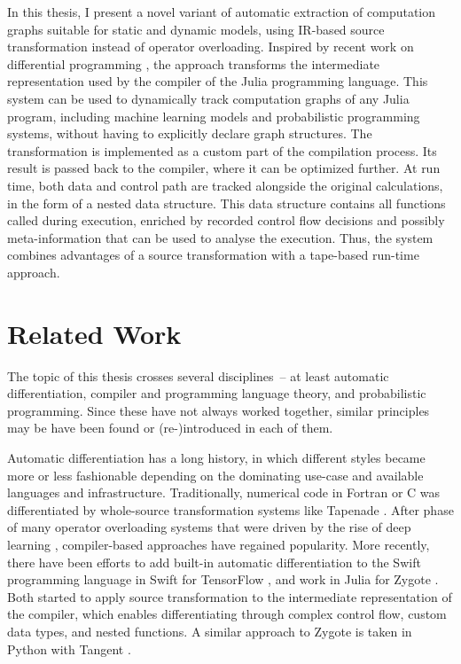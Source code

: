 In this thesis, I present a novel variant of automatic extraction of computation graphs suitable for
static and dynamic models, using IR-based source transformation instead of operator overloading.
Inspired by recent work on differential programming \parencite{innes2018don}, the approach
transforms the intermediate representation used by the compiler of the Julia programming language.
This system can be used to dynamically track computation graphs of any Julia program, including
machine learning models and probabilistic programming systems, without having to explicitly declare
graph structures. The transformation is implemented as a custom part of the compilation process.
Its result is passed back to the compiler, where it can be optimized further. At run time, both data
and control path are tracked alongside the original calculations, in the form of a nested data
structure.  This data structure contains all functions called during execution, enriched by recorded
control flow decisions and possibly meta-information that can be used to analyse the
execution. Thus, the system combines advantages of a source transformation with a tape-based
run-time approach.


\section{Related Work}
\label{sec:related-work}

The topic of this thesis crosses several disciplines~-- at least automatic differentiation, compiler
and programming language theory, and probabilistic programming.  Since these have not always worked
together, similar principles may be have been found or (re-)introduced in each of them.

Automatic differentiation has a long history, in which different styles became more or less
fashionable depending on the dominating use-case and available languages and infrastructure.
Traditionally, numerical code in Fortran or C was differentiated by whole-source transformation
systems like Tapenade \parencite{tapenadedevelopers2019tapenade}.  After phase of many operator
overloading systems that were driven by the rise of deep learning
\parencite{abadi2015tensorflow,paszke2017automatic,neubig2017dynet,tokui2015chainer}, compiler-based
approaches have regained popularity.  More recently, there have been efforts to add built-in
automatic differentiation to the Swift programming language in Swift for TensorFlow
\parencite{tensorflowdevelopers2018swift}, and work in Julia for Zygote \parencite{innes2018don}.
Both started to apply source transformation to the intermediate representation of the compiler,
which enables differentiating through complex control flow, custom data types, and nested functions.
A similar approach to Zygote is taken in Python with Tangent \parencite{vanmerrienboer2018tangent}.

